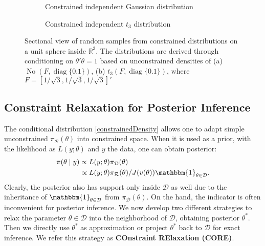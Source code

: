 \documentclass[10pt,fleqn]{article}
\newcommand{\be}{\begin{equation}\begin{aligned}}
\newcommand{\ee}{\end{aligned}\end{equation}}
\newcommand{\bb}[1]{\mathbb{#1}}
\newcommand{\mc}[1]{\mathcal{#1}}
\DeclareMathOperator{\No}{No}
\DeclareMathOperator{\diag}{diag}
\DeclareMathOperator{\1}{\mathbbm{1}}
\begin{document}
\begin{figure}[H]
\begin{subfigure}[b]{0.45\textwidth}
\caption{Constrained independent Gaussian distribution}
\end{subfigure}
\begin{subfigure}[b]{0.45\textwidth}
\caption{Constrained independent $t_3$ distribution}
\end{subfigure}
\caption{Sectional view of random samples from constrained distributions on a unit sphere inside $\bb R^3$. The distributions are derived through conditioning on $\theta'\theta=1$ based on unconstrained densities of (a) $\No( F, \diag\{0.1\})$, 
 (b) $t_3(F,\diag\{0.1\} )$, where $F=[1/\sqrt{3},1/\sqrt{3},1/\sqrt{3}]'$\\
}
\label{sphere_examples}
\end{figure}



\subsection{ Constraint Relaxation for Posterior Inference}

The conditional distribution \eqref{constrainedDensity} allows one to adapt
simple unconstrained $\pi_{\mc R}(\theta)$ into constrained space. When it
is used as a prior,
with  the likelihood as $ L(y;\theta)$  and $y$ the data, one can obtain posterior:
\be
\label{exactPosterior}
\pi(\theta\mid y) & \propto L(y;\theta)\pi_{\mc D}(\theta) \\
& \propto L(y;\theta) \pi_{\mc
R}(\theta) /J(v(\theta))\mathbbm{1}_{\theta\in \mc D}.
\ee
Clearly, the
posterior also has support only inside $\mc D$ as well due to the inheritance of
$\mathbbm{1}_{\theta\in \mc D}$ from $\pi_{\mc D}(\theta)$. On the hand,
the indicator is often inconvenient for posterior inference. We now develop
 two different strategies to relax the parameter $\theta\in \mc D$ into the neighborhood
of $\mc D$, obtaining posterior $\theta^*$. Then we directly use $\theta^*$ as approximation
or project $\theta^*$ back to $\mc D$ for exact inference. We refer this
strategy as {\bf COnstraint RElaxation (CORE)}.
\end{document}
